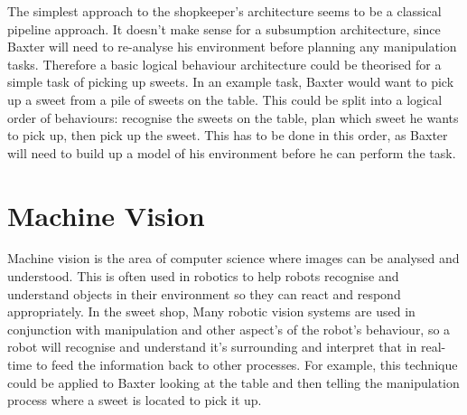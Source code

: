 \newline\newline
The simplest approach to the shopkeeper's architecture seems to be a classical pipeline approach. It doesn't make sense for a subsumption architecture, since Baxter will need to re-analyse his environment before planning any manipulation tasks. Therefore a basic logical behaviour architecture could be theorised for a simple task of picking up sweets. In an example task, Baxter would want to pick up a sweet from a pile of sweets on the table. This could be split into a logical order of behaviours: recognise the sweets on the table, plan which sweet he wants to pick up, then pick up the sweet. This has to be done in this order, as Baxter will need to build up a model of his environment before he can perform the task.
\section{Machine Vision}
Machine vision is the area of computer science where images can be analysed and understood. This is often used in robotics to help robots recognise and understand objects in their environment so they can react and respond appropriately. In the sweet shop, Many robotic vision systems are used in conjunction with manipulation and other aspect's of the robot's behaviour, so a robot will recognise and understand it's surrounding and interpret that in real-time to feed the information back to other processes. For example, this technique could be applied to Baxter looking at the table and then telling the manipulation process where a sweet is located to pick it up.

